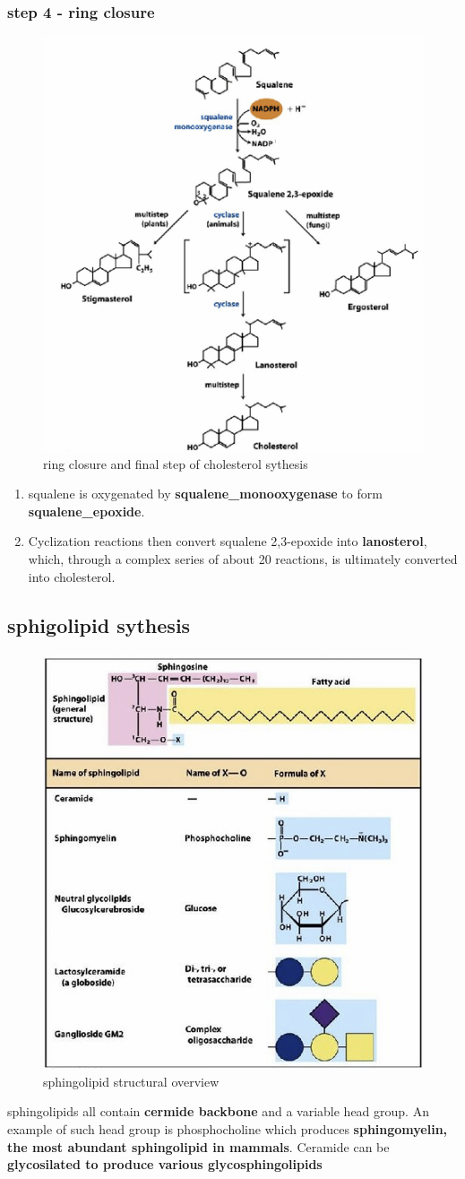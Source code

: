 \documentclass[../main.tex]{subfiles}
\begin{document}
\subsubsection{step 4 - ring closure}
\begin{figure}[H]
    \centering
    \includegraphics[width=0.5\linewidth]{ringClosure.png}
    \caption{ring closure and final step of cholesterol sythesis}
    \label{fig:enter-label}
\end{figure}
\begin{enumerate}
    \item \gls{squalene} is oxygenated by \textbf{\gls{squalene_monooxygenase}} to form \textbf{\gls{squalene_epoxide}}. 
    \item Cyclization reactions then convert squalene 2,3-epoxide into\textbf{ \gls{lanosterol}}, which, through a complex series of about 20 reactions, is ultimately converted into \gls{cholesterol}.
\end{enumerate}

\subsection{sphigolipid sythesis}
\begin{figure}[H]
    \centering
    \includegraphics[width=0.5\linewidth]{sphingolipids_overview.png}
    \caption{sphingolipid structural overview}
    \label{fig:enter-label}
\end{figure}
sphingolipids all contain \textbf{cermide backbone} and a variable head group. An example of such head group is phosphocholine which produces\textbf{ sphingomyelin, the most abundant sphingolipid in mammals}. Ceramide can be \textbf{glycosilated to produce various glycosphingolipids}
\end{document}
